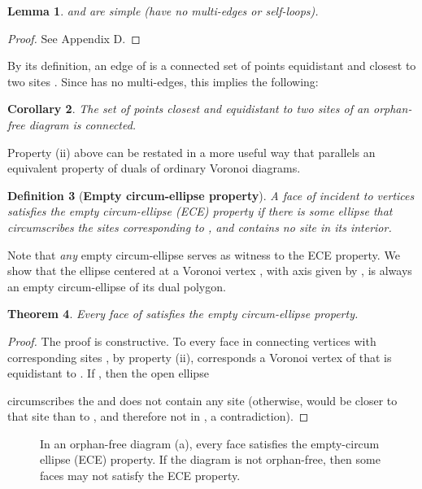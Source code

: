 \documentclass[11pt]{article}
\newtheorem{theorem}{Theorem}[section]
\newtheorem{lemma}[theorem]{Lemma}
\newtheorem{definition}[theorem]{Definition}
\newtheorem{corollary}[theorem]{Corollary}
\begin{document}
\begin{lemma}\label{lem:simple}
 and  are simple (have no multi-edges or self-loops). \end{lemma}
\begin{proof}
See Appendix D. 
\end{proof}

By its definition, an edge of  is a connected set of points equidistant
and closest to two sites . Since  has no multi-edges, this implies the following:


\begin{corollary}\label{cor:Pij}
The set of points closest and equidistant to two sites of an orphan-free diagram is connected. 
\end{corollary}





Property (ii) above can be restated in a more useful way that parallels an equivalent property of duals of ordinary Voronoi diagrams. 


\begin{definition}[{\bf Empty circum-ellipse property}]\label{def:ece}
	A face of  incident to vertices  satisfies the empty circum-ellipse (ECE) property if there is
\emph{some} ellipse that circumscribes the sites corresponding to ,
and contains no site  in its interior. 
\end{definition}

Note that \emph{any} empty circum-ellipse serves as witness to the ECE property. 
We show that the ellipse centered at a Voronoi vertex , with axis given by , is always an empty circum-ellipse of its dual polygon.

\begin{theorem}\label{th:ece}
	Every face of  satisfies the empty circum-ellipse property. 
\end{theorem}
\begin{proof}
The proof is constructive. 
To every face in  connecting vertices with corresponding sites , 
by property (ii), corresponds a Voronoi vertex
 of  that is equidistant to . 
If ,
then the open ellipse 

circumscribes the  and does not contain any site (otherwise,  would be closer to that site than to , 
and therefore not in , a contradiction). 
\end{proof}



\begin{figure}[ht]
\centering
{}
\label{fig:f4}
\caption{In an orphan-free diagram (a), every face  satisfies the
empty-circum ellipse (ECE) property. If the diagram is not orphan-free, then
some faces may not satisfy the ECE property.}
\end{figure}
\end{document}
